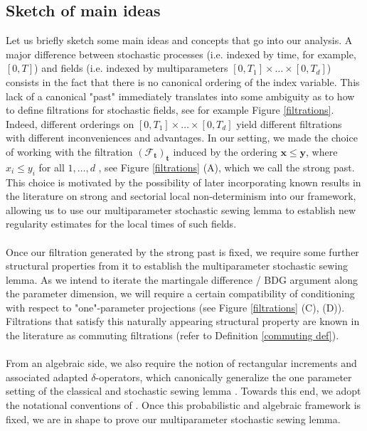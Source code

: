 \documentclass[11pt,oneside,english,reqno]{amsart}
\numberwithin{equation}{section}
\numberwithin{figure}{section}
\theoremstyle{plain}
\theoremstyle{definition}
\theoremstyle{remark}
\theoremstyle{plain}
\theoremstyle{plain}
\theoremstyle{plain}
\theoremstyle{plain}
\theoremstyle{plain}
\newcommand{\bx}{\mathbf{x}}
\newcommand{\by}{\mathbf{y}}
\newcommand{\bt}{\mathbf{t}}
\begin{document}
\subsection*{Sketch of main ideas}
Let us briefly sketch some main ideas and concepts that go into our analysis. A major difference between stochastic processes (i.e. indexed by time, for example, $[0, T]$) and fields (i.e. indexed by multiparameters $[0, T_1]\times \dots \times [0,T_d]$) consists in the fact that there is no canonical ordering of the index variable. This lack of a canonical "past" immediately translates into some ambiguity as to how to define filtrations for stochastic fields, see for example Figure \ref{filtrations}. Indeed, different orderings on $[0, T_1]\times \dots \times [0, T_d]$ yield different filtrations with different inconveniences and advantages. In our setting, we made the choice of working with the filtration $(\mathcal{F}_\bt)_\bt$ induced by the ordering $\bx\leq \by $, where  $x_i\leq y_i$ for all $1, \dots, d$ , see Figure \ref{filtrations} (A), which we call the strong past. This choice is motivated by the possibility of later incorporating known results in the literature on strong and sectorial local non-determinism \cite{Xiao} into our framework, allowing us to use our multiparameter stochastic sewing lemma to establish new regularity estimates for the local times of such fields. \\
\\
Once our filtration generated by the strong past is fixed, we require some further structural properties from it to establish the multiparameter stochastic sewing lemma. As we intend to iterate the martingale difference / BDG argument along the parameter dimension, we will require a certain compatibility of conditioning with respect to "one"-parameter projections (see Figure \ref{filtrations} (C), (D)). Filtrations that satisfy this naturally appearing structural property are known in the literature as commuting filtrations (refer to Definition \ref{commuting def}).\\
\\
From an algebraic side, we also require the notion of rectangular increments and associated adapted $\delta$-operators, which canonically generalize the one parameter setting of the classical \cite{gubi} and stochastic sewing lemma \cite{stochasticsewing}. Towards this end, we adopt the notational conventions of \cite{Harang2021}. Once this probabilistic and algebraic framework is fixed, we are in shape to prove our multiparameter stochastic sewing lemma.
\end{document}
